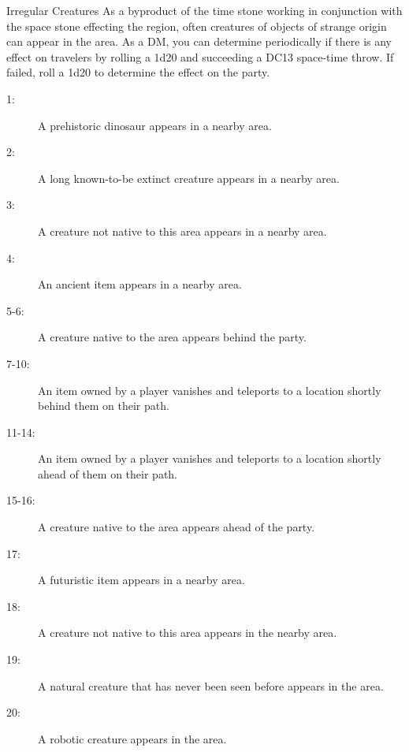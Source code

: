 \documentclass[letterpaper,10pt,twoside,twocolumn,openany]{book}
\begin{document}
\begin{commentbox}{Irregular Creatures}
	As a byproduct of the time stone working in conjunction with the space stone effecting the region, often creatures of objects of strange origin can appear in the area. As a DM, you can determine periodically if there is any effect on travelers by rolling a 1d20 and succeeding a DC13 space-time throw. If failed, roll a 1d20 to determine the effect on the party.
	\hline
	\begin{description}
		\item[1:] A prehistoric dinosaur appears in a nearby area.
		\item[2:] A long known-to-be extinct creature appears in a nearby area.
		\item[3:] A creature not native to this area appears in a nearby area.
		\item[4:] An ancient item appears in a nearby area.
		\item[5-6:] A creature native to the area appears behind the party.
		\item[7-10:] An item owned by a player vanishes and teleports to a location shortly behind them on their path.
		\item[11-14:] An item owned by a player vanishes and teleports to a location shortly ahead of them on their path.
		\item[15-16:] A creature native to the area appears ahead of the party.
		\item[17:] A futuristic item appears in a nearby area.
		\item[18:] A creature not native to this area appears in the nearby area.
		\item[19:] A natural creature that has never been seen before appears in the area.
		\item[20:] A robotic creature appears in the area.
	\end{description}
\end{commentbox}
\end{document}
